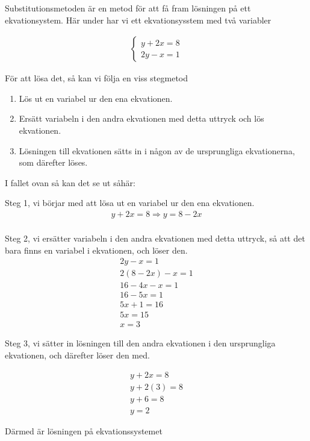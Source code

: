 Substitutionsmetoden är en metod för att få fram lösningen på ett ekvationsystem. Här under har vi ett ekvationsysstem med två variabler

\begin{align}
	\begin{cases}
		y+2x=8 \\
		2y-x = 1
	\end{cases}
\end{align}

För att lösa det, så kan vi följa en viss stegmetod

\begin{enumerate}
	\item Lös ut en variabel ur den ena ekvationen.
	\item Ersätt variabeln i den andra ekvationen med detta uttryck och lös ekvationen.
	\item Lösningen till ekvationen sätts in i någon av de ursprungliga ekvationerna, som därefter löses.
\end{enumerate}

I fallet ovan så kan det se ut såhär:

Steg 1, vi börjar med att lösa ut en variabel ur den ena ekvationen.
\begin{align}
	y+2x = 8 \Rightarrow y = 8-2x \\
\end{align}

Steg 2, vi ersätter variabeln i den andra ekvationen med detta uttryck, så att det bara finns en variabel i ekvationen, och löser den.
\begin{align}
	2y-x = 1 \\
	2(8-2x)-x = 1 \\
	16-4x-x = 1 \\
	16-5x = 1 \\
	5x + 1 = 16 \\
	5x = 15 \\
	x = 3
\end{align}

Steg 3, vi sätter in lösningen till den andra ekvationen i den ursprungliga ekvationen, och därefter löser den med.

\begin{align}
	y+2x = 8 \\
	y+2(3) = 8 \\
	y+6 = 8 \\
	y = 2
\end{align}

Därmed är lösningen på ekvationssystemet

